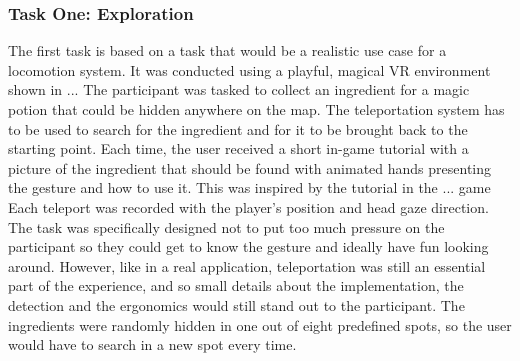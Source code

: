 \subsubsection{Task One: Exploration}
The first task is based on a task that would be a realistic use case for a locomotion system. It was conducted using a playful, magical VR environment shown in ... %
The participant was tasked to collect an ingredient for a magic potion that could be hidden anywhere on the map. The teleportation system has to be used to search for the ingredient and for it to be brought back to the starting point. Each time, the user received a short in-game tutorial with a picture of the ingredient that should be found with animated hands presenting the gesture and how to use it. This was inspired by the tutorial in the ... game %
Each teleport was recorded with the player's position and head gaze direction. The task was specifically designed not to put too much pressure on the participant so they could get to know the gesture and ideally have fun looking around. However, like in a real application, teleportation was still an essential part of the experience, and so small details about the implementation, the detection and the ergonomics would still stand out to the participant. The ingredients were randomly hidden in one out of eight predefined spots, so the user would have to search in a new spot every time.

